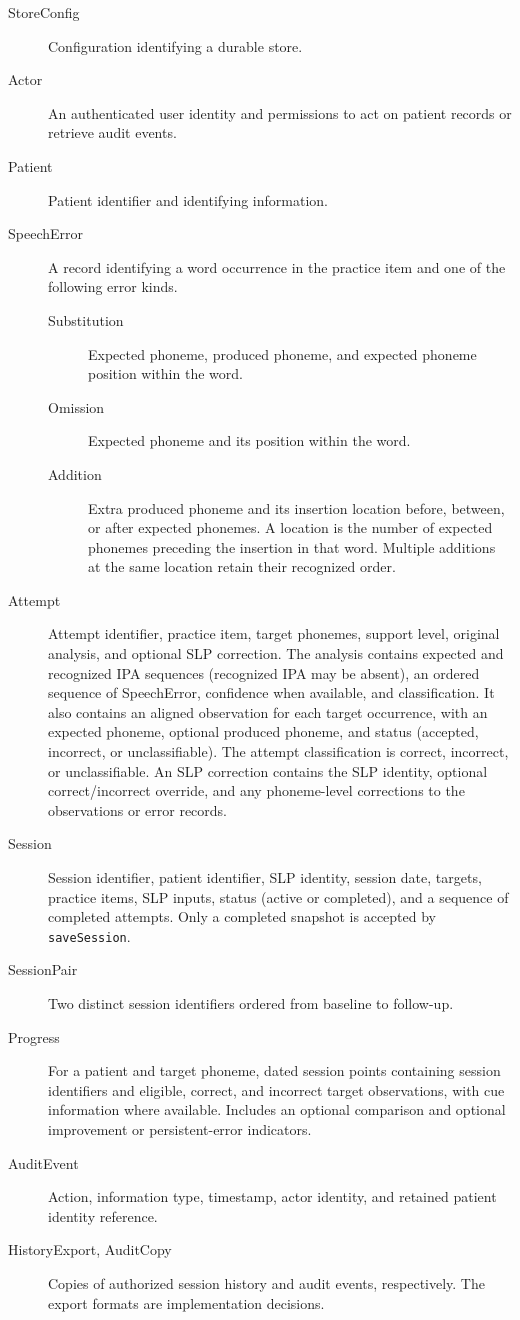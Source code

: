 \documentclass[12pt, titlepage]{article}
\begin{document}
\begin{description}
\item[StoreConfig] Configuration identifying a durable store.
\item[Actor] An authenticated user identity and permissions to act on patient
records or retrieve audit events.
\item[Patient] Patient identifier and identifying information.
\item[SpeechError] A record identifying a word occurrence in the practice
item and one of the following error kinds.
\begin{description}
\item[Substitution] Expected phoneme, produced phoneme, and expected
phoneme position within the word.
\item[Omission] Expected phoneme and its position within the word.
\item[Addition] Extra produced phoneme and its insertion location before,
between, or after expected phonemes. A location is the number of expected
phonemes preceding the insertion in that word. Multiple additions at the
same location retain their recognized order.
\end{description}
\item[Attempt] Attempt identifier, practice item, target phonemes, support
level, original analysis, and optional SLP correction. The analysis contains
expected and recognized IPA sequences (recognized IPA may be absent),
an ordered sequence of SpeechError, confidence when available, and
classification. It also contains an aligned observation
for each target occurrence, with an expected phoneme, optional produced
phoneme, and status (accepted, incorrect, or unclassifiable). The attempt
classification is correct, incorrect, or unclassifiable. An SLP correction
contains the SLP identity, optional correct/incorrect override, and any
phoneme-level corrections to the observations or error records.
\item[Session] Session identifier, patient identifier, SLP identity, session
date, targets, practice items, SLP inputs, status (active or completed),
and a sequence of completed attempts. Only a completed snapshot is accepted
by \texttt{saveSession}.
\item[SessionPair] Two distinct session identifiers ordered from baseline
to follow-up.
\item[Progress] For a patient and target phoneme, dated session points
containing session identifiers and eligible, correct, and incorrect target
observations, with cue information where available. Includes an optional
comparison and optional improvement or persistent-error indicators.
\item[AuditEvent] Action, information type, timestamp, actor identity, and
retained patient identity reference.
\item[HistoryExport, AuditCopy] Copies of authorized session history and
audit events, respectively. The export formats are implementation decisions.
\end{description}
\end{document}
